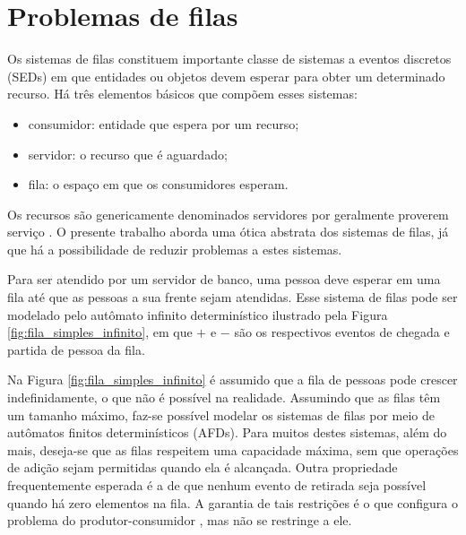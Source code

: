 \chapter{Problemas de filas}
\label{cap:filas}

Os sistemas de filas constituem importante classe de sistemas a eventos discretos (\acs{SED}s) em que entidades ou objetos devem esperar para obter um determinado recurso. Há três elementos básicos que compõem esses sistemas: \begin{itemize}
	\item consumidor: entidade que espera por um recurso;
	\item servidor: o recurso que é aguardado;
	\item fila: o espaço em que os consumidores esperam.
\end{itemize} Os recursos são genericamente denominados servidores por geralmente proverem serviço \cite{cassandras}. O presente trabalho aborda uma ótica abstrata dos sistemas de filas, já que há a possibilidade de reduzir problemas a estes sistemas.

Para ser atendido por um servidor de banco, uma pessoa deve esperar em uma fila até que as pessoas a sua frente sejam atendidas. Esse sistema de filas pode ser modelado pelo autômato infinito determinístico ilustrado pela Figura \ref{fig:fila_simples_infinito}, em que $+$ e $-$ são os respectivos eventos de chegada e partida de pessoa da fila.


Na Figura \ref{fig:fila_simples_infinito} é assumido que a fila de pessoas pode crescer indefinidamente, o que não é possível na realidade. Assumindo que as filas têm um tamanho máximo, faz-se possível modelar os sistemas de filas por meio de autômatos finitos determinísticos (AFDs). Para muitos destes sistemas, além do mais, deseja-se que as filas respeitem uma capacidade máxima, sem que operações de adição sejam permitidas quando ela é alcançada. Outra propriedade frequentemente esperada é a de que nenhum evento de retirada seja possível quando há zero elementos na fila. A garantia de tais restrições é o que configura o problema do produtor-consumidor \cite{mehmood}, mas não se restringe a ele.

